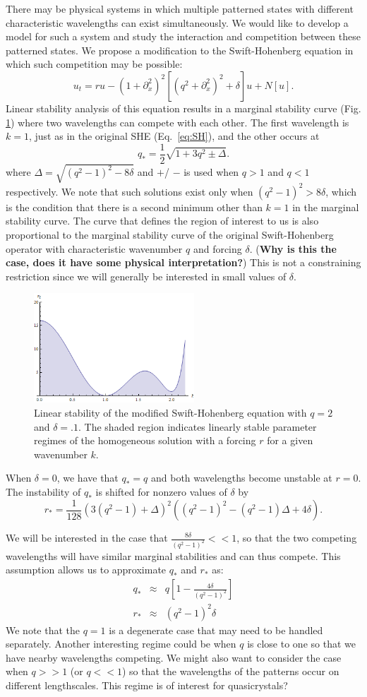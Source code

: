 \documentclass[api,pof,pre,12pt,a4paper]{revtex4-1}
\newcommand{\beqn}{\begin{equation}}
\newcommand{\eeqn}{\end{equation}}
\newcommand{\beqa}{\begin{eqnarray}}
\newcommand{\eeqa}{\end{eqnarray}}
\newcommand{\NOTE}[1]{\marginpar{\footnotesize\textbf{NOTE}} (\textbf{#1})}
\newcommand{\FIGmarginalstability}{
\begin{figure}[h]\center
\includegraphics[width=60mm]{MarginalStability.png}
\caption{\label{fig:marginalstability} Linear stability of the modified Swift-Hohenberg equation with $q=2$ and $\delta=.1$.  The shaded region indicates linearly stable parameter regimes of the homogeneous solution with a forcing $r$ for a given wavenumber $k$.}
\end{figure}
}
\begin{document}
There may be physical systems in which multiple patterned states with different characteristic wavelengths can exist simultaneously.  We would like to develop a model for such a system and study the interaction and competition between these patterned states.  We propose a modification to the Swift-Hohenberg equation in which such competition may be possible:
\begin{equation}
u_t= r u-\left(1+\partial_{x}^2\right)^2 \left[\left(q^2+\partial_{x}^2\right)^2+\delta \right] u+N[u]\label{eq:SHm}.
\end{equation}
Linear stability analysis of this equation results in a marginal stability curve (Fig. \ref{fig:marginalstability}) where two wavelengths can compete with each other.  The first wavelength is  $k=1$, just as in the original SHE (Eq.~\ref{eq:SH}), and the other occurs at 
\beqn
q_*=\frac{1}{2}\sqrt{1+3q^2 \pm\Delta}.
\eeqn
where $\Delta=\sqrt{(q^2-1)^2-8\delta}$ and $+$/ $-$ is used when $q>1$ and $q<1$ respectively.  We note that such solutions exist only when $(q^2-1)^2>8\delta$, which is the condition that there is a second minimum other than $k=1$ in the marginal stability curve.  The curve that defines the region of interest to us is also proportional to the marginal stability curve of the original Swift-Hohenberg operator with characteristic wavenumber $q$ and forcing $\delta$.  \NOTE{Why is this the case, does it have some physical interpretation?}  This is not a constraining restriction since we will generally be interested in small values of $\delta$.
\FIGmarginalstability
When $\delta=0$, we have that $q_*=q$  and both wavelengths  become unstable at $r=0$. The instability of $q_*$ is shifted for nonzero values of $\delta$ by
\beqn
r_*=\frac{1}{128} \left(3( q^2-1)+\Delta\right)^2 \left( (q^2-1)^2- (q^2-1)\Delta+4 \delta \right).
\eeqn

We will be interested in the case that $\tfrac{8\delta}{(q^2-1)^2}<<1$,  so that the two competing wavelengths will have similar marginal stabilities and can thus compete.  This assumption allows us to approximate $q_*$ and $r_*$ as:
\beqa
q_*&\approx&q\left[1-\frac{4\delta}{(q^2-1)^2}\right] \\
r_*&\approx& (q^2-1)^2 \delta
\eeqa
We note that the $q=1$ is a degenerate case that may need to be handled separately.  Another interesting regime could be when $q$ is close to one so that we have nearby wavelengths competing. We might also want to consider the case when $q>>1$ (or $q<<1$) so that the wavelengths of the patterns occur on different lengthscales.  This regime is of interest for quasicrystals?
\end{document}

